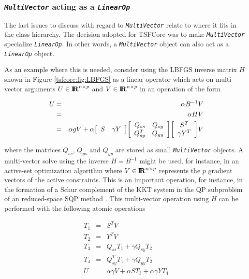 %
\subsubsection{\texttt{\textit{Multi\-Vector}} acting as a {}\texttt{\textit{LinearOp}}}
\label{tsfcore:sec:multi_vec_linear_op}
%

The last issues to discuss with regard to
{}\texttt{\textit{Multi\-Vector}} relate to where it fits in the class
hierarchy.  The decision adopted for TSFCore was to make
{}\texttt{\textit{Multi\-Vector}} specialize
{}\texttt{\textit{LinearOp}}.  In other words, a
{}\texttt{\textit{Multi\-Vector}} object can also act as a
{}\texttt{\textit{LinearOp}} object.

As an example where this is needed, consider using the LBFGS inverse
matrix $H$ shown in Figure {}\ref{tsfcore:fig:LBFGS} as a linear
operator which acts on multi-vector arguments $U\in\RE^{n \times p}$
and $V\in\RE^{n \times p}$ in an operation of the form

\begin{eqnarray*}
U & = & \alpha B^{-1} V \\
  & = & \alpha H V \\
  & = & \alpha g V + \alpha
                            {\bmat{cc} S & \gamma Y \emat}
                            {\bmat{cc} Q_{ss} & Q_{sy} \\ Q_{sy}^T & Q_{yy} \emat}
                            {\bmat{c} S^T \\ \gamma Y^T \emat} V
\end{eqnarray*}

where the matrices $Q_{ss}$, $Q_{ys}$ and $Q_{yy}$ are stored as small
{}\texttt{\textit{Multi\-Vector}} objects.  A multi-vector solve using
the inverse $H = B^{-1}$ might be used, for instance, in an active-set
optimization algorithm where $V\in\RE^{n \times p}$ represents the $p$
gradient vectors of the active constraints.  This is an important
operation, for instance, in the formation of a Schur complement of the
KKT system in the QP subproblem of an reduced-space SQP method
{}\cite{RABartlett_2001}.  This multi-vector operation using $H$ can
be performed with the following atomic operations

\begin{eqnarray*}
T_1 & = & S^T V \\
T_2 & = & Y^T V \\
T_3 & = & Q_{ss} T_1 + \gamma Q_{sy} T_2 \\
T_4 & = & Q_{sy}^T T_1 + \gamma Q_{yy} T_2 \\
U   & = & \alpha \gamma V + \alpha S T_3 + \alpha \gamma Y T_4
\end{eqnarray*}

